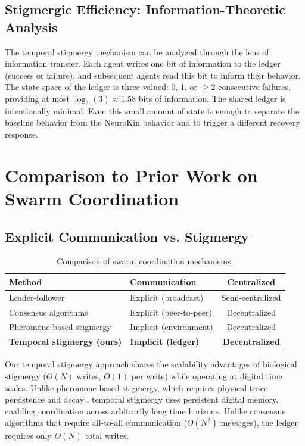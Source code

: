 \documentclass[12pt,a4paper,oneside]{report}
\begin{document}
\subsection{Stigmergic Efficiency: Information-Theoretic Analysis}

The temporal stigmergy mechanism can be analyzed through the lens of information transfer. Each agent writes one bit of information to the ledger (success or failure), and subsequent agents read this bit to inform their behavior. The state space of the ledger is three-valued: 0, 1, or $\geq$2 consecutive failures, providing at most $\log_2(3) \approx 1.58$ bits of information. The shared ledger is intentionally minimal. Even this small amount of state is enough to separate the baseline behavior from the NeuroKin behavior and to trigger a different recovery response.

\section{Comparison to Prior Work on Swarm Coordination}

\subsection{Explicit Communication vs. Stigmergy}

\begin{table}[H]
\centering
\caption{Comparison of swarm coordination mechanisms.}
\label{tab:swarm_comparison_lit}
\begin{tabular}{p{4.0cm}p{4.0cm}c}
\toprule
\textbf{Method} & \textbf{Communication} & \textbf{Centralized} \\
\midrule
Leader-follower & Explicit (broadcast) & Semi-centralized \\
Consensus algorithms & Explicit (peer-to-peer) & Decentralized \\
Pheromone-based stigmergy & Implicit (environment) & Decentralized \\
\textbf{Temporal stigmergy (ours)} & \textbf{Implicit (ledger)} & \textbf{Decentralized} \\
\bottomrule
\end{tabular}
\end{table}

Our temporal stigmergy approach shares the scalability advantages of biological stigmergy ($O(N)$ writes, $O(1)$ per write) while operating at digital time scales. Unlike pheromone-based stigmergy, which requires physical trace persistence and decay \cite{bongard2006resilient}, temporal stigmergy uses persistent digital memory, enabling coordination across arbitrarily long time horizons. Unlike consensus algorithms that require all-to-all communication ($O(N^2)$ messages), the ledger requires only $O(N)$ total writes.
\end{document}
